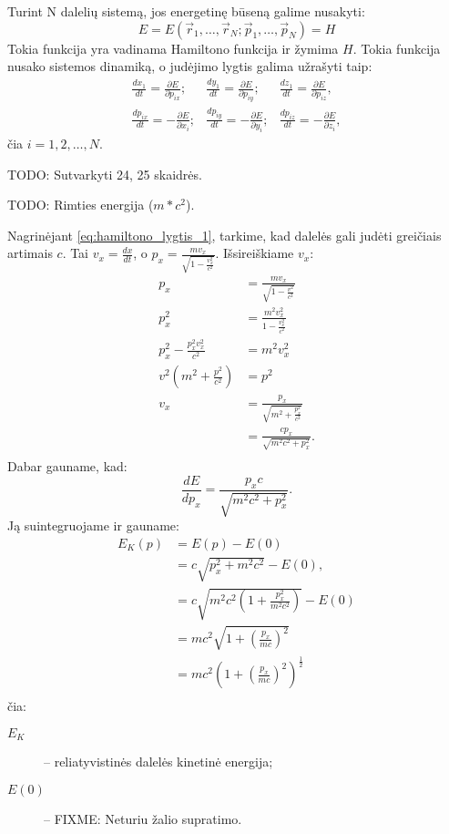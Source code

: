 Turint N dalelių sistemą, jos energetinę būseną galime nusakyti:
\begin{equation*}
  E = E(\vec{r}_{1},\ldots,\vec{r}_{N}; \vec{p}_{1},\ldots,\vec{p}_{N}) = H
\end{equation*}
Tokia funkcija yra vadinama Hamiltono funkcija ir žymima $H$. Tokia
funkcija nusako sistemos dinamiką, o judėjimo lygtis galima
užrašyti taip:
\begin{align}
  \frac{dx_{1}}{dt} = \frac{\partial E}{\partial p_{ix}};&
  \frac{dy_{1}}{dt} = \frac{\partial E}{\partial p_{iy}};&
  \frac{dz_{1}}{dt} = \frac{\partial E}{\partial p_{iz}},
  \label{eq:hamiltono_lygtis_1} \\
  \frac{dp_{ix}}{dt} = -\frac{\partial E}{\partial x_{i}}; &
  \frac{dp_{iy}}{dt} = -\frac{\partial E}{\partial y_{i}}; &
  \frac{dp_{iz}}{dt} = -\frac{\partial E}{\partial z_{i}},
  \label{eq:hamiltono_lygtis_2}
\end{align}
čia $i = 1,2,\ldots,N$.

TODO: Sutvarkyti 24, 25 skaidrės.

TODO: Rimties energija ($m*c^{2}$).

Nagrinėjant \ref{eq:hamiltono_lygtis_1}, tarkime, kad dalelės gali
judėti greičiais artimais $c$. Tai $v_{x} = \frac{dx}{dt}$, o
$p_{x} = \frac{mv_{x}}{\sqrt{1 - \frac{v_{x}^{2}}{c^{2}}}}$.
Išsireiškiame $v_{x}$:
\begin{align*}
  p_{x} &= \frac{mv_{x}}{\sqrt{1 - \frac{v^{2}}{c^{2}}}} \\
  p^{2}_{x} &= \frac{m^{2}v_{x}^{2}}{1 - \frac{v_{x}^{2}}{c^{2}}} \\
  p^{2}_{x} - \frac{p_{x}^{2}v_{x}^{2}}{c^{2}} &= m^{2}v_{x}^{2} \\
  v^{2}\left( m^{2} + \frac{p^{2}}{c^{2}} \right) &= p^{2} \\
  v_{x}
  &= \frac{p_{x}}{\sqrt{m^{2} + \frac{p_{x}^{2}}{c^{2}}}} \\
  &= \frac{cp_{x}}{\sqrt{m^{2}c^{2} + p_{x}^{2}}}. \\
\end{align*}
Dabar gauname, kad:
\begin{equation*}
  \frac{dE}{dp_{x}} = \frac{p_{x}c}{\sqrt{m^{2}c^{2} + p_{x}^{2}}}.
\end{equation*}
Ją suintegruojame ir gauname:
\begin{align*}
  E_{K}(p)
  &= E(p) - E(0) \\
  &= c\sqrt{p_{x}^{2} + m^{2}c^{2}} - E(0), \\
  &= c\sqrt{m^{2}c^{2}
    \left( 1 + \frac{p_{x}^{2}}{m^{2}c^{2}}  \right)}
    - E(0) \\
  &= mc^{2}\sqrt{1 + \left( \frac{p_{x}}{mc} \right)^{2}} \\
  &=  mc^{2}
    \left(1 + \left( \frac{p_{x}}{mc} \right)^{2}\right)^{\frac{1}{2}} \\
\end{align*}
čia:
\begin{description}
  \item[$E_{K}$] – reliatyvistinės dalelės kinetinė energija;
  \item[$E(0)$] – FIXME: Neturiu žalio supratimo.
\end{description}

